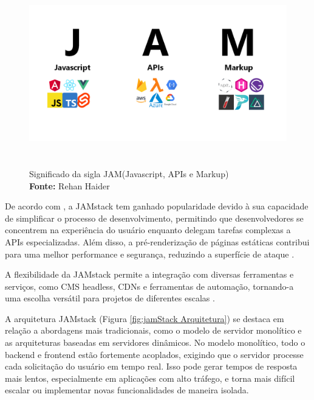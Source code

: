 \begin{figure}[H]
    \centering
    \includegraphics[height=8cm, keepaspectratio]{img/arquitetura/sigla JAM stack.png}
    \caption{ Significado da sigla JAM(Javascript, APIs e Markup)
 \\
        \textbf{Fonte:} Rehan Haider}
    \label{fig:jamStack sigla}
\end{figure}
De acordo com \cite{smashingmagazine}, a JAMstack tem ganhado popularidade devido à sua capacidade de simplificar o processo de desenvolvimento, permitindo que desenvolvedores se concentrem na experiência do usuário enquanto delegam tarefas complexas a APIs especializadas. Além disso, a pré-renderização de páginas estáticas contribui para uma melhor performance e segurança, reduzindo a superfície de ataque \citep{jamstackbook}.

A flexibilidade da JAMstack permite a integração com diversas ferramentas e serviços, como CMS headless, CDNs e ferramentas de automação, tornando-a uma escolha versátil para projetos de diferentes escalas \citep{netlifyjamstack}.

A arquitetura JAMstack (Figura \ref{fig:jamStack Arquitetura}) se destaca em relação a abordagens mais tradicionais, como o modelo de servidor monolítico e as arquiteturas baseadas em servidores dinâmicos. No modelo monolítico, todo o backend e frontend estão fortemente acoplados, exigindo que o servidor processe cada solicitação do usuário em tempo real. Isso pode gerar tempos de resposta mais lentos, especialmente em aplicações com alto tráfego, e torna mais difícil escalar ou implementar novas funcionalidades de maneira isolada.

